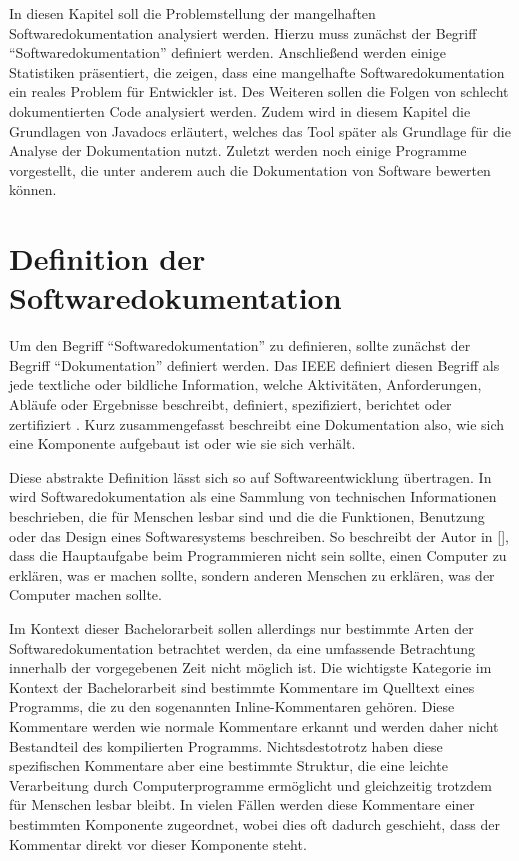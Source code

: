 \label{sec:background}
In diesen Kapitel soll die Problemstellung der mangelhaften Softwaredokumentation analysiert werden. Hierzu muss zunächst der Begriff \enquote{Softwaredokumentation} definiert werden. Anschließend werden einige Statistiken präsentiert, die zeigen, dass eine mangelhafte Softwaredokumentation ein reales Problem für Entwickler ist. Des Weiteren sollen die Folgen von schlecht dokumentierten Code analysiert werden. Zudem wird in diesem Kapitel die Grundlagen von Javadocs erläutert, welches das Tool später als Grundlage für die Analyse der Dokumentation nutzt. Zuletzt werden noch einige Programme vorgestellt, die unter anderem auch die Dokumentation von Software bewerten können. 

\section{Definition der Softwaredokumentation}
Um den Begriff \enquote{Softwaredokumentation} zu definieren, sollte zunächst der Begriff \enquote{Dokumentation} definiert werden. Das IEEE  definiert diesen Begriff als jede textliche oder bildliche Information, welche Aktivitäten, Anforderungen, Abläufe oder Ergebnisse beschreibt, definiert, spezifiziert, berichtet oder zertifiziert \cite[S. 28]{IEEEStandardGlossaryofSoftwareEngineeringTerminology}. Kurz zusammengefasst beschreibt eine Dokumentation also, wie sich eine Komponente aufgebaut ist oder wie sie sich verhält.

Diese abstrakte Definition lässt sich so auf Softwareentwicklung übertragen. In \cite[S. 125]{Softwaredocumentationandstandards} wird Softwaredokumentation als eine Sammlung von technischen Informationen beschrieben, die für Menschen lesbar sind und die die Funktionen, Benutzung oder das Design eines Softwaresystems beschreiben. So beschreibt der Autor in [], dass die Hauptaufgabe beim Programmieren nicht sein sollte, einen Computer zu erklären, was er machen sollte, sondern anderen Menschen zu erklären, was der Computer machen sollte.

Im Kontext dieser Bachelorarbeit sollen allerdings nur bestimmte Arten der Softwaredokumentation betrachtet werden, da eine umfassende Betrachtung innerhalb der vorgegebenen Zeit nicht möglich ist. Die wichtigste Kategorie im Kontext der Bachelorarbeit sind bestimmte Kommentare im Quelltext eines Programms, die zu den sogenannten Inline-Kommentaren gehören. Diese Kommentare werden wie normale Kommentare erkannt und werden daher nicht Bestandteil des kompilierten Programms. Nichtsdestotrotz haben diese spezifischen Kommentare aber eine bestimmte Struktur, die eine leichte Verarbeitung durch Computerprogramme ermöglicht und gleichzeitig trotzdem für Menschen lesbar bleibt. In vielen Fällen werden diese Kommentare einer bestimmten Komponente zugeordnet, wobei dies oft dadurch geschieht, dass der Kommentar direkt vor dieser Komponente steht.

